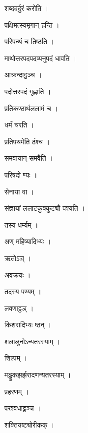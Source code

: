 \documentclass[10pt, openany]{book}
\begin{document}
\noindent शब्ददर्दुरं करोति ।

\noindent पक्षिमत्स्यमृगान् हन्ति ।

\noindent परिपन्थं च तिष्ठति ।

\noindent माथोत्तरपदपदव्यनुपदं धावति ।

\noindent आक्रन्दाट्ठञ्च ।

\noindent पदोत्तरपदं गृह्णाति ।

\noindent प्रतिकण्ठार्थललामं च ।

\noindent धर्मं चरति ।

\noindent प्रतिपथमेति ठंश्च ।

\noindent समवायान् समवैति ।

\noindent परिषदो ण्यः ।

\noindent सेनाया वा ।

\noindent संज्ञायां ललाटकुक्कुट्यौ पश्यति ।

\noindent तस्य धर्म्यम् ।

\noindent अण् महिष्यादिभ्यः ।

\noindent ऋतोऽञ् ।

\noindent अवक्रयः ।

\noindent तदस्य पण्यम् ।

\noindent लवणाट्ठञ् ।

\noindent किशरादिभ्यः ष्ठन् ।

\noindent शलालुनोऽन्यतरस्याम् ।

\noindent शिल्पम् ।

\noindent मड्डुकझर्झरादणन्यतरस्याम् ।

\noindent प्रहरणम् ।

\noindent परश्वधाट्ठञ्च ।

\noindent शक्तियष्ट्योरीकक् ।
\end{document}
